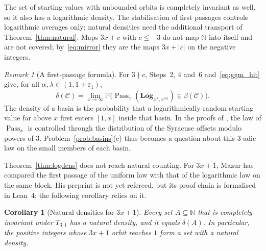\documentclass[12pt]{amsart}
\newtheorem{corollary}{Corollary}
\theoremstyle{definition}
\theoremstyle{remark}
\newtheorem{remark}{Remark}
\newcommand{\N}{\mathbb{N}}
\begin{document}
The set of starting values with unbounded orbits is completely invariant as well, so it also has a logarithmic density. The stabilisation of first passages controls logarithmic averages only; natural densities need the additional transport of Theorem~\ref{thm:natural}. Maps $3x+c$ with $c\le-3$ do not map $\N$ into itself and are not covered; by~\eqref{eq:mirror} they are the maps $3x+|c|$ on the negative integers.

\begin{remark}[A first-passage formula]
\label{rem:passage}
For $3\nmid c$, Steps~2, 4 and~6 and~\eqref{eq:ggm_hit} give, for all $\alpha,\lambda\in(1,1+\varepsilon_1)$,
\[
\delta(\mathcal C)=\lim_{x\to\infty}\mathbb P\bigl(\operatorname{Pass}_x(\mathbf{Log}_{x^{\lambda},x^{\alpha\lambda}})\in\beta(\mathcal C)\bigr).
\]
The density of a basin is the probability that a logarithmically random starting value far above $x$ first enters $[1,x]$ inside that basin. In the proofs of \cite{Tao_2022,GGM_2025}, the law of $\operatorname{Pass}_x$ is controlled through the distribution of the Syracuse offsets modulo powers of $3$. Problem~\ref{prob:basins}(c) thus becomes a question about this $3$-adic law on the small members of each basin.
\end{remark}

Theorem~\ref{thm:logdens} does not reach natural counting. For $3x+1$, Mazur \cite{Mazur_2026} has compared the first passage of the uniform law with that of the logarithmic law on the same block. His preprint is not yet refereed, but its proof chain is formalised in Lean~4; the following corollary relies on it.

\begin{corollary}[Natural densities for $3x+1$]
\label{cor:natural}
Every set $A\subseteq\N$ that is completely invariant under $T_{3,1}$ has a natural density, and it equals $\delta(A)$. In particular, the positive integers whose $3x+1$ orbit reaches $1$ form a set with a natural density.
\end{corollary}
\end{document}
